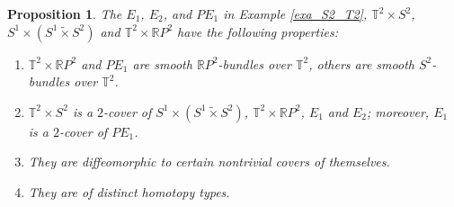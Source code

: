 \documentclass[12pt]{amsart}
\theoremstyle{plain}
\newtheorem{proposition}[theorem]{Proposition}
\theoremstyle{definition}
\theoremstyle{question}
\theoremstyle{remark}
\theoremstyle{assumption}
\numberwithin{equation}{section}
\theoremstyle{bigthm}
\begin{document}
\begin{proposition}\label{prop_Z2_4-manifold}
The $E_{1}$, $E_{2}$, and $PE_{1}$ in Example \ref{exa_S2_T2}, $\mathbb{T}^{2} \times S^{2}$, $S^{1} \times (S^{1} \tilde{\times} S^{2})$ and $\mathbb{T}^{2} \times \mathbb{R} P^{2}$ have the following properties:
\begin{enumerate}
\item $\mathbb{T}^{2} \times \mathbb{R} P^{2}$ and $PE_{1}$ are smooth $\mathbb{R}P^{2}$-bundles over $\mathbb{T}^{2}$, others are smooth $S^{2}$-bundles over $\mathbb{T}^{2}$.

\item $\mathbb{T}^{2} \times S^{2}$ is a $2$-cover of $S^{1} \times (S^{1} \tilde{\times} S^{2})$, $\mathbb{T}^{2} \times \mathbb{R} P^{2}$, $E_{1}$ and $E_{2}$; moreover, $E_{1}$ is a $2$-cover of $PE_{1}$.

\item They are diffeomorphic to certain nontrivial covers of themselves.

\item They are of distinct homotopy types.
\end{enumerate}
\end{proposition}
\end{document}

